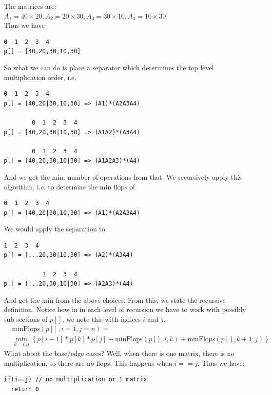 The matrices are:\\
$A_1 = 40\times20, A_2 = 20\times30, A_3 = 30\times10, A_4 = 10\times30$\\
Thus we have
\begin{lstlisting}[style=raygeneric]
        0  1  2  3  4
p[] = [40,20,30,10,30]
\end{lstlisting}
So what we can do is place a separator which determines the top level
multiplication order, i.e.
\begin{lstlisting}[style=raygeneric]
        0  1  2  3  4
p[] = [40,20|30,10,30] => (A1)*(A2A3A4)

        0  1  2  3  4
p[] = [40,20,30|10,30] => (A1A2)*(A3A4)

        0  1  2  3  4
p[] = [40,20,30,10|30] => (A1A2A3)*(A4)
\end{lstlisting}
And we get the min. number of operations from that. We recursively apply
this algorithm, i.e. to determine the min flops of 
\begin{lstlisting}[style=raygeneric]
        0  1  2  3  4
p[] = [40,20|30,10,30] => (A1)*(A2A3A4)
\end{lstlisting}
We would apply the separation to
\begin{lstlisting}[style=raygeneric]
           1  2  3  4
p[] = [...20,30|10,30] => (A2)*(A3A4)

           1  2  3  4
p[] = [...20,30,10|30] => (A2A3)*(A4)
\end{lstlisting}
And get the min from the above choices. From this, we state the recursive
definition. Notice how in in each level of recursion we have to work with
possibly sub sections of $p[]$, we note this with indices $i$ and $j$.
\begin{align*}
&\text{minFlops}(p[],i = 1,j=n) = \\
&\min_{k=i..j}\left\{p[i-1]*p[k]*p[j] + \text{minFlops}(p[],i,k)+
                        \text{minFlops}(p[],k+1,j)\right\}
\end{align*}
What about the base/edge cases? Well, when there is one matrix, there is no
multiplication, so there are no flops. This happens when $i==j$.
Thus we have:
\begin{lstlisting}[style=pseudostyle,numbers=none]
if(i==j) // no multiplication or 1 matrix
  return 0
\end{lstlisting}

